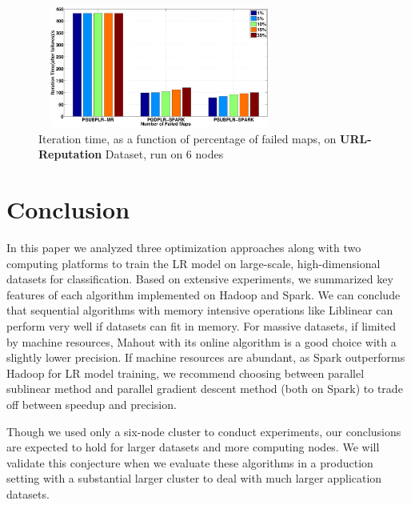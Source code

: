 \documentclass[10pt, conference, compsocconf]{IEEEtran}
\begin{document}
\begin{figure}[tb]
\center \includegraphics[height=4cm,width=8cm]{img/fault_tolerance.eps}\vspace{-0.3cm}
\caption{Iteration time, as a function of percentage of failed maps, on \textbf{URL-Reputation} Dataset, run on 6 nodes}\label{fig:14}\vspace{-0.5cm}
\end{figure}


\section{Conclusion} \label{sec:concl}
In this paper we analyzed three optimization approaches along with two computing platforms to train the LR model on large-scale, high-dimensional datasets for classification.  Based on extensive experiments, we summarized key features of each algorithm implemented on Hadoop and Spark.
We can conclude that sequential algorithms with memory intensive operations like Liblinear can perform very well if datasets can fit in memory.
For massive datasets, if limited by machine resources, Mahout with its online algorithm is a good choice with a slightly lower precision.
If machine resources are abundant, as Spark outperforms Hadoop for LR model training, we recommend choosing between parallel sublinear method and parallel gradient descent method (both on Spark) to trade off between speedup and precision.

Though we used only a six-node cluster to conduct experiments, our conclusions are expected to hold for larger datasets and more computing nodes.  We will validate this conjecture when we evaluate these algorithms in a production setting with a substantial larger cluster to deal with much larger application datasets.


\begin{small}


\end{small}
\end{document}
